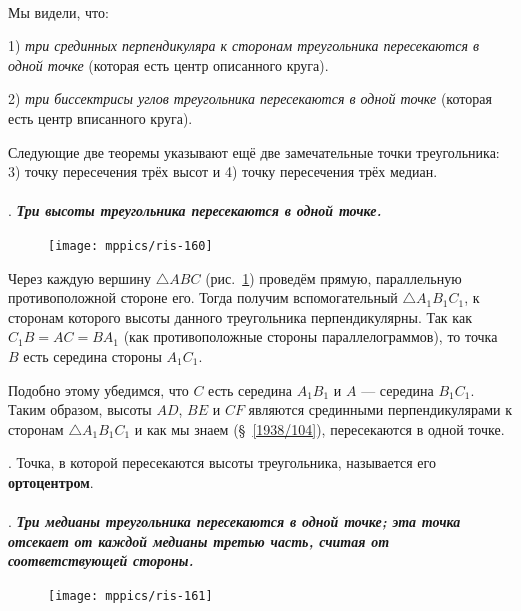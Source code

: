 \documentclass[oneside]{book}
\begin{document}
\paragraph{}\label{1938/141}
Мы видели, что:

1) \emph{три срединных перпендикуляра к сторонам треугольника пересекаются в одной точке} (которая есть центр описанного круга). 

2) \emph{три биссектрисы углов треугольника пересекаются в одной точке} (которая есть центр вписанного круга).

Следующие две теоремы указывают ещё две замечательные точки треугольника:
3) точку пересечения трёх высот и 4) точку пересечения трёх медиан.

\paragraph{}\label{1938/142}
.
\textbf{\emph{Три высоты треугольника пересекаются в одной точке.}}

\begin{figure}[h]
\centering
\texttt{[image: mppics/ris-160]}
\caption{}\label{1938/ris-160}
\end{figure}

Через каждую вершину $\triangle ABC$ (рис.~\ref{1938/ris-160}) проведём прямую, параллельную противоположной стороне его.
Тогда получим вспомогательный $\triangle A_1B_1C_1$, к сторонам которого высоты данного треугольника перпендикулярны.
Так как $C_1B=AC=BA_1$ (как противоположные стороны параллелограммов), то точка $B$ есть середина стороны $A_1C_1$.

Подобно этому убедимся, что $C$ есть середина $A_1B_1$ и $A$ — середина $B_1C_1$.
Таким образом, высоты $AD$, $BE$ и $CF$ являются
срединными перпендикулярами к сторонам $\triangle A_1B_1C_1$ и как мы знаем (§~\ref{1938/104}), пересекаются в одной точке.

.
Точка, в которой пересекаются высоты треугольника, называется его \textbf{ортоцентром}.

\paragraph{}\label{1938/143}
.
\textbf{\emph{Три медианы треугольника пересекаются в одной точке;
эта точка отсекает от каждой медианы третью часть, считая от соответствующей стороны.}}

\begin{figure}
\centering
\texttt{[image: mppics/ris-161]}
\caption{}\label{1938/ris-161}
\end{figure}
\end{document}

